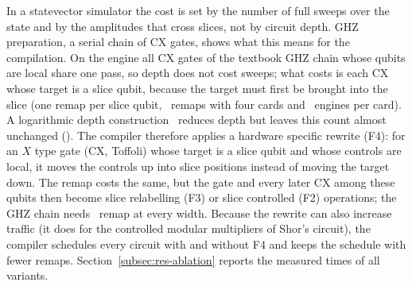 In a statevector simulator the cost is set by the number of full sweeps over the state and by the amplitudes that
cross slices, not by circuit depth. GHZ preparation, a serial chain of CX gates, shows what this means for the
compilation. On the engine all CX gates of the textbook GHZ chain whose qubits are local
share one pass, so depth does not cost sweeps; what costs is each CX whose target is a slice qubit, because the
target must first be brought into the slice (one remap per slice qubit, \NumGhzChainRemapsNoFfour~remaps with four
cards and \NumEnginesFlagship~engines per card). A logarithmic depth construction~\cite{cruz2019efficient} reduces depth but
leaves this count almost unchanged (\NumGhzLogRemapsNoFfour). The compiler therefore applies a hardware specific
rewrite (F4): for an $X$ type gate (CX, Toffoli) whose target is a slice qubit and whose controls are local, it moves
the controls up into slice positions instead of moving the target down. The remap costs the same, but the gate and
every later CX among these qubits then become slice relabelling (F3) or slice controlled (F2) operations; the GHZ
chain needs \NumGhzChainRemapsFfour~remap at every width. Because the rewrite can also increase traffic (it does for
the controlled modular multipliers of Shor's circuit), the compiler schedules every circuit with and without F4 and
keeps the schedule with fewer remaps. Section~\ref{subsec:res-ablation} reports the measured times of all variants.
